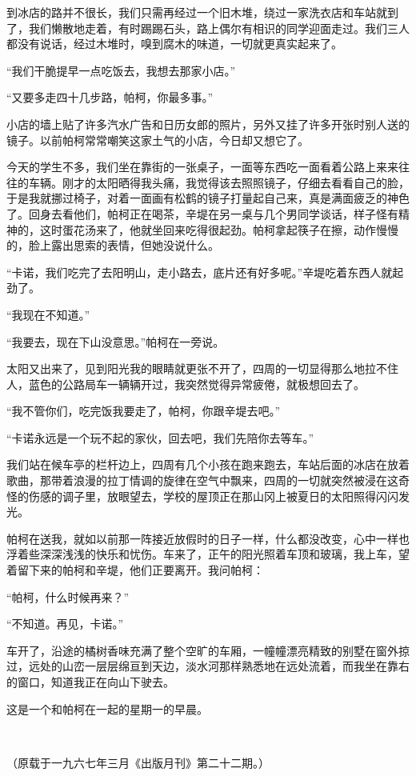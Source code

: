 \par 到冰店的路并不很长，我们只需再经过一个旧木堆，绕过一家洗衣店和车站就到了，我们懒散地走着，有时踢踢石头，路上偶尔有相识的同学迎面走过。我们三人都没有说话，经过木堆时，嗅到腐木的味道，一切就更真实起来了。
\par “我们干脆提早一点吃饭去，我想去那家小店。”
\par “又要多走四十几步路，帕柯，你最多事。”
\par 小店的墙上贴了许多汽水广告和日历女郎的照片，另外又挂了许多开张时别人送的镜子。以前帕柯常常嘲笑这家土气的小店，今日却又想它了。
\par 今天的学生不多，我们坐在靠街的一张桌子，一面等东西吃一面看着公路上来来往往的车辆。刚才的太阳晒得我头痛，我觉得该去照照镜子，仔细去看看自己的脸，于是我就挪过椅子，对着一面画有松鹤的镜子打量起自己来，真是满面疲乏的神色了。回身去看他们，帕柯正在喝茶，辛堤在另一桌与几个男同学谈话，样子怪有精神的，这时蛋花汤来了，他就坐回来吃得很起劲。帕柯拿起筷子在擦，动作慢慢的，脸上露出思索的表情，但她没说什么。
\par “卡诺，我们吃完了去阳明山，走小路去，底片还有好多呢。”辛堤吃着东西人就起劲了。
\par “我现在不知道。”
\par “我要去，现在下山没意思。”帕柯在一旁说。
\par 太阳又出来了，见到阳光我的眼睛就更张不开了，四周的一切显得那么地拉不住人，蓝色的公路局车一辆辆开过，我突然觉得异常疲倦，就极想回去了。
\par “我不管你们，吃完饭我要走了，帕柯，你跟辛堤去吧。”
\par “卡诺永远是一个玩不起的家伙，回去吧，我们先陪你去等车。”
\par 我们站在候车亭的栏杆边上，四周有几个小孩在跑来跑去，车站后面的冰店在放着歌曲，那带着浪漫的拉丁情调的旋律在空气中飘来，四周的一切就突然被浸在这奇怪的伤感的调子里，放眼望去，学校的屋顶正在那山冈上被夏日的太阳照得闪闪发光。
\par 帕柯在送我，就如以前那一阵接近放假时的日子一样，什么都没改变，心中一样也浮着些深深浅浅的快乐和忧伤。车来了，正午的阳光照着车顶和玻璃，我上车，望着留下来的帕柯和辛堤，他们正要离开。我问帕柯：
\par “帕柯，什么时候再来？”
\par “不知道。再见，卡诺。”
\par 车开了，沿途的橘树香味充满了整个空旷的车厢，一幢幢漂亮精致的别墅在窗外掠过，远处的山峦一层层绵亘到天边，淡水河那样熟悉地在远处流着，而我坐在靠右的窗口，知道我正在向山下驶去。
\par 这是一个和帕柯在一起的星期一的早晨。
\par  
\par （原载于一九六七年三月《出版月刊》第二十二期。）




